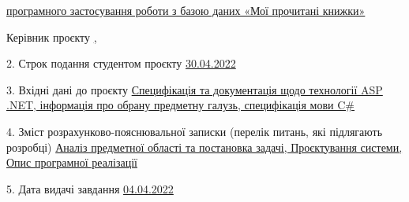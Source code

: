 {        \uline{програмного застосування роботи з базою даних «Мої прочитані книжки»\hfill}

        Керівник проєкту \uline{\hfill\ScientificDirectorNameFull, \ScientificDirectorPositionSmall\hfill}

        2. Строк подання студентом проєкту \uline{\hfill30.04.2022\hfill}
        
        3. Вхідні дані до проєкту \uline{\hfill Специфікація та документація щодо технології ASP .NET, інформація про обрану предметну галузь, специфікація мови C\#\hfill}

        \uline{\hfill}

        4. Зміст розрахунково-пояснювальної записки (перелік питань, які підлягають розробці)
        \uline{ \hfill Аналіз предметної області та постановка задачі, Проєктування системи, Опис програмної реалізації\hfill}
        
        \uline{\hfill}

        5. Дата видачі завдання \uline{\hfill 04.04.2022 \hfill}
}
